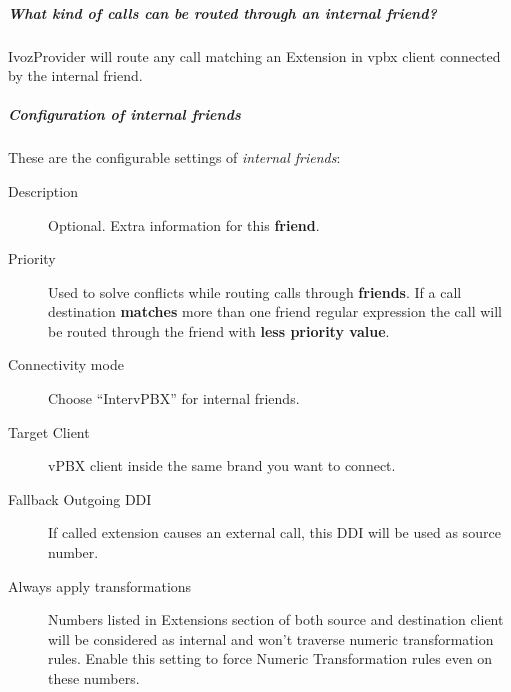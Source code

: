 \documentclass[letterpaper,10pt,english]{sphinxmanual}
\begin{document}
\subparagraph{What kind of calls can be routed through an \emph{internal friend}?}
\label{administration_portal/client/vpbx/routing_endpoints/friends/internal_friends:what-kind-of-calls-can-be-routed-through-an-internal-friend}
IvozProvider will route any call matching an Extension in vpbx client connected by the internal friend.


\subparagraph{Configuration of internal friends}
\label{administration_portal/client/vpbx/routing_endpoints/friends/internal_friends:configuration-of-internal-friends}
These are the configurable settings of \emph{internal friends}:
\begin{description}
\item[{Description}] \leavevmode{}\label{administration_portal/client/vpbx/routing_endpoints/friends/internal_friends:term-description}
Optional. Extra information for this \textbf{friend}.

\item[{Priority}] \leavevmode{}\label{administration_portal/client/vpbx/routing_endpoints/friends/internal_friends:term-priority}
Used to solve conflicts while routing calls through \textbf{friends}.
If a call destination \textbf{matches} more than one friend regular expression
the call will be routed through the friend with \textbf{less priority value}.

\item[{Connectivity mode}] \leavevmode{}\label{administration_portal/client/vpbx/routing_endpoints/friends/internal_friends:term-connectivity-mode}
Choose ``IntervPBX'' for internal friends.

\item[{Target Client}] \leavevmode{}\label{administration_portal/client/vpbx/routing_endpoints/friends/internal_friends:term-target-client}
vPBX client inside the same brand you want to connect.

\item[{Fallback Outgoing DDI}] \leavevmode{}\label{administration_portal/client/vpbx/routing_endpoints/friends/internal_friends:term-fallback-outgoing-ddi}
If called extension causes an external call, this DDI will be used as source number.

\item[{Always apply transformations}] \leavevmode{}\label{administration_portal/client/vpbx/routing_endpoints/friends/internal_friends:term-always-apply-transformations}
Numbers listed in Extensions section of both source and destination client will be considered as internal and
won't traverse numeric transformation rules. Enable this setting to force Numeric Transformation rules even on these numbers.

\end{description}
\end{document}
